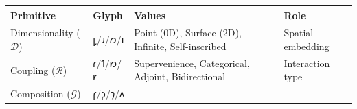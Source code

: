\begin{longtable}[]{@{}llll@{}}
\toprule
\begin{minipage}[b]{0.30\columnwidth}\raggedright
Primitive\strut
\end{minipage} & \begin{minipage}[b]{0.19\columnwidth}\raggedright
Glyph\strut
\end{minipage} & \begin{minipage}[b]{0.22\columnwidth}\raggedright
Values\strut
\end{minipage} & \begin{minipage}[b]{0.17\columnwidth}\raggedright
Role\strut
\end{minipage}\tabularnewline
\midrule
\endhead
\begin{minipage}[t]{0.30\columnwidth}\raggedright
Dimensionality (\(\mathcal{D}\))\strut
\end{minipage} & \begin{minipage}[t]{0.19\columnwidth}\raggedright
𐑛/𐑨/𐑼/𐑦\strut
\end{minipage} & \begin{minipage}[t]{0.22\columnwidth}\raggedright
Point (0D), Surface (2D), Infinite, Self-inscribed\strut
\end{minipage} & \begin{minipage}[t]{0.17\columnwidth}\raggedright
Spatial embedding\strut
\end{minipage}\tabularnewline
\begin{minipage}[t]{0.30\columnwidth}\raggedright
Coupling (\(\mathcal{R}\))\strut
\end{minipage} & \begin{minipage}[t]{0.19\columnwidth}\raggedright
𐑩/𐑑/𐑽/𐑾\strut
\end{minipage} & \begin{minipage}[t]{0.22\columnwidth}\raggedright
Supervenience, Categorical, Adjoint, Bidirectional\strut
\end{minipage} & \begin{minipage}[t]{0.17\columnwidth}\raggedright
Interaction type\strut
\end{minipage}\tabularnewline
\begin{minipage}[t]{0.30\columnwidth}\raggedright
Composition (\(\mathcal{G}\))\strut
\end{minipage} & \begin{minipage}[t]{0.19\columnwidth}\raggedright
𐑝/𐑜/𐑠/𐑵\strut
\end{minipage} & \begin{minipage}[t]{0.22\columnwidth}\raggedright

\end{minipage}
\end{longtable}
